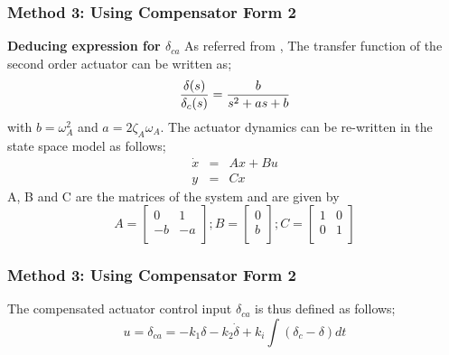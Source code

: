 \documentclass[table,10pt,red]{beamer}	%
\begin{document}
\begin{frame}[shrink]
\frametitle{Method 3: Using Compensator Form 2}
\textbf{Deducing expression for $\delta_{ca}$}
As referred from \cite{ogata2010}, 
The transfer function of the second order actuator can be written as;
%
\begin{equation*}
{{\delta (s)}\over{\delta_c(s)}} = {{b}\over{s^2 + as + b}}
\end{equation*}
%
with $b=\omega_A^2$ and $a=2\zeta_A\omega_A$. The actuator dynamics can be re-written in the state space model as follows;
%
\begin{eqnarray*}
\dot{x} &=& Ax+Bu \nonumber \\
y &=& Cx
\end{eqnarray*}
A, B and C are the matrices of the system and are given by
$$
A=\left[
\begin{array}{cccc}
0 & 1\\
-b & -a\\
\end{array}\right]; 
B=\left[
\begin{array}{cccc}
0 \\
b\\
\end{array}\right]; 
C=\left[
\begin{array}{cccc}
1 & 0\\
0 & 1\\
\end{array}\right]
$$
%
\end{frame}
\begin{frame}
\frametitle{Method 3: Using Compensator Form 2}
The compensated actuator control input $\delta_{ca}$ is thus defined as follows;
%
\begin{equation*}
u= \delta_{ca}= -k_1\delta -k_2\dot{\delta} +k_i \int{(\delta_c-\delta)}dt
\end{equation*}
\end{frame}
\end{document}
